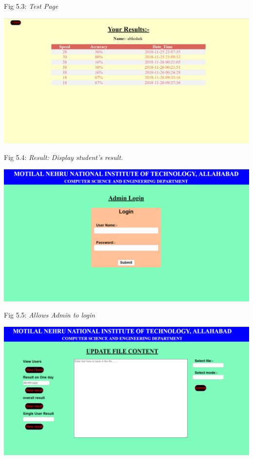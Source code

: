 \documentclass{mnnit}
\begin{document}
\begin{center}
Fig 5.3: \emph{Test Page}
\end{center}
\includegraphics[width=\textwidth]{images/4_viewResultuser.PNG}
\begin{center}
Fig 5.4: \emph{Result: Display student's result.}
\end{center}
\includegraphics[width=\textwidth]{images/5_adminLogin.PNG}
\begin{center}
Fig 5.5: \emph{Allows Admin to login}
\end{center}
\includegraphics[width=\textwidth]{images/6_admindashboard.PNG}
\end{document}
